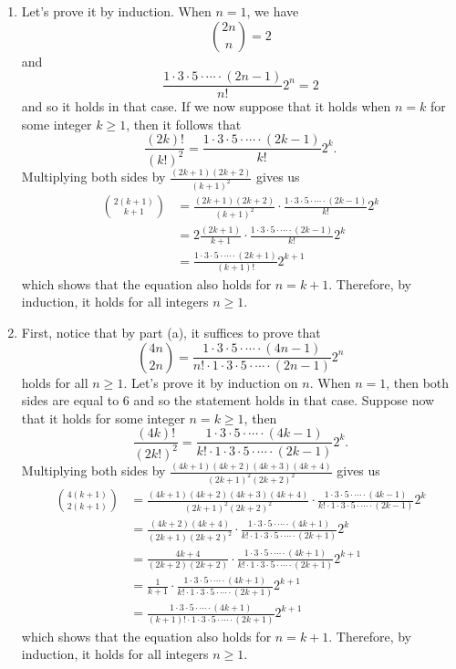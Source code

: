 \begin{solution}
    \begin{enumerate}
        \item Let's prove it by induction. When $n = 1$, we have 
        $$\binom{2n}{n} = 2$$
        and 
        $$\frac{1\cdot 3 \cdot 5 \cdot \cdots \cdot (2n-1)}{n!}2^n = 2$$
        and so it holds in that case. If we now suppose that it holds when $n = k$ for some integer $k \geq 1$, then it follows that
        $$\frac{(2k)!}{(k!)^2} = \frac{1\cdot 3 \cdot 5 \cdot \cdots \cdot (2k-1)}{k!}2^k.$$
        Multiplying both sides by $\frac{(2k+1)(2k+2)}{(k+1)^2}$ gives us
        \begin{align*}
            \binom{2(k+1)}{k+1} &= \frac{(2k+1)(2k+2)}{(k+1)^2} \cdot \frac{1\cdot 3 \cdot 5 \cdot \cdots \cdot (2k-1)}{k!}2^k \\
            &= 2\frac{(2k+1)}{k+1} \cdot \frac{1\cdot 3 \cdot 5 \cdot \cdots \cdot (2k-1)}{k!}2^k \\
            &= \frac{1\cdot 3 \cdot 5 \cdot \cdots \cdot (2k+1)}{(k+1)!}2^{k+1} 
        \end{align*}
        which shows that the equation also holds for $n = k+1$. Therefore, by induction, it holds for all integers $n \geq 1$.
        \item First, notice that by part (a), it suffices to prove that
        $$\binom{4n}{2n} = \frac{1\cdot 3 \cdot 5 \cdot \cdots \cdot (4n-1)}{n! \cdot 1\cdot 3 \cdot 5 \cdot \cdots \cdot (2n-1)}2^n $$
        holds for all $n \geq 1$. Let's prove it by induction on $n$. When $n = 1$, then both sides are equal to 6 and so the statement holds in that case. Suppose now that it holds for some integer $n = k \geq 1$, then 
        $$\frac{(4k)!}{(2k!)^2} = \frac{1\cdot 3 \cdot 5 \cdot \cdots \cdot (4k-1)}{k! \cdot 1\cdot 3 \cdot 5 \cdot \cdots \cdot (2k-1)}2^k.$$
        Multiplying both sides by $\frac{(4k+1)(4k+2)(4k+3)(4k+4)}{(2k+1)^2(2k+2)^2}$ gives us
        \begin{align*}
            \binom{4(k+1)}{2(k+1)} &= \frac{(4k+1)(4k+2)(4k+3)(4k+4)}{(2k+1)^2(2k+2)^2} \cdot \frac{1\cdot 3 \cdot 5 \cdot \cdots \cdot (4k-1)}{k! \cdot 1\cdot 3 \cdot 5 \cdot \cdots \cdot (2k-1)}2^k \\
            &= \frac{(4k+2)(4k+4)}{(2k+1)(2k+2)^2} \cdot \frac{1\cdot 3 \cdot 5 \cdot \cdots \cdot (4k+1)}{k! \cdot 1\cdot 3 \cdot 5 \cdot \cdots \cdot (2k+1)}2^k \\
            &= \frac{4k+4}{(2k+2)(2k+2)} \cdot \frac{1\cdot 3 \cdot 5 \cdot \cdots \cdot (4k+1)}{k! \cdot 1\cdot 3 \cdot 5 \cdot \cdots \cdot (2k+1)}2^{k+1} \\
            &= \frac{1}{k+1} \cdot \frac{1\cdot 3 \cdot 5 \cdot \cdots \cdot (4k+1)}{k! \cdot 1\cdot 3 \cdot 5 \cdot \cdots \cdot (2k+1)}2^{k+1} \\
            &= \frac{1\cdot 3 \cdot 5 \cdot \cdots \cdot (4k+1)}{(k+1)! \cdot 1\cdot 3 \cdot 5 \cdot \cdots \cdot (2k+1)}2^{k+1}
        \end{align*}
        which shows that the equation also holds for $n = k+1$. Therefore, by induction, it holds for all integers $n \geq 1$.
    \end{enumerate}
\end{solution}

